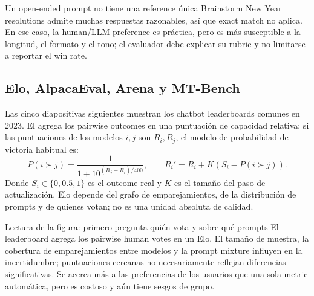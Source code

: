 
\begin{warningbox}{Un open-ended prompt no tiene una reference única}
Brainstorm New Year resolutions admite muchas respuestas razonables, así que exact match no aplica. En ese caso, la human/LLM preference es práctica, pero es más susceptible a la longitud, el formato y el tono; el evaluador debe explicar su rubric y no limitarse a reportar el win rate.
\end{warningbox}


\subsection{Elo, AlpacaEval, Arena y MT-Bench}

Las cinco diapositivas siguientes muestran los chatbot leaderboards comunes en 2023. El  agrega los pairwise outcomes en una puntuación de capacidad relativa; si las puntuaciones de los modelos $i,j$ son $R_i,R_j$, el modelo de probabilidad de victoria habitual es:
\[
P(i\succ j)=\frac{1}{1+10^{(R_j-R_i)/400}},\qquad
R_i' = R_i + K(S_i-P(i\succ j)).
\]
Donde $S_i\in\{0,0.5,1\}$ es el outcome real y $K$ es el tamaño del paso de actualización. Elo depende del grafo de emparejamientos, de la distribución de prompts y de quienes votan; no es una unidad absoluta de calidad.


\begin{knowledgebox}{Lectura de la figura: primero pregunta quién vota y sobre qué prompts}
El leaderboard agrega los pairwise human votes en un Elo. El tamaño de muestra, la cobertura de emparejamientos entre modelos y la prompt mixture influyen en la incertidumbre; puntuaciones cercanas no necesariamente reflejan diferencias significativas. Se acerca más a las preferencias de los usuarios que una sola metric automática, pero es costoso y aún tiene sesgos de grupo.
\end{knowledgebox}

